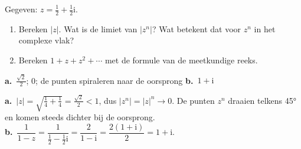 \begin{oefeningen}
\begin{oefening}[2]
 Gegeven: $z = \tfrac12 + \tfrac12\mathrm{i}$.
\begin{enumerate}
  \item Bereken $|z|$. Wat is de limiet van $|z^n|$? Wat betekent dat voor $z^n$ in het complexe vlak?
  \item Bereken $1 + z + z^2 + \cdots$ met de formule van de meetkundige reeks.
\end{enumerate}
\begin{solution}
\textbf{a.}~$\tfrac{\sqrt2}{2}$; 0; de punten spiraleren naar de oorsprong \quad \textbf{b.}~$1+\mathrm{i}$
\end{solution}
\begin{fullsolution}
\textbf{a.}~$|z|=\sqrt{\tfrac14+\tfrac14}=\tfrac{\sqrt2}{2}<1$, dus $|z^n|=|z|^n\to 0$. De punten $z^n$ draaien telkens 45° en komen steeds dichter bij de oorsprong.\\
\textbf{b.}~$\dfrac{1}{1-z}=\dfrac{1}{\tfrac12-\tfrac12\mathrm{i}}=\dfrac{2}{1-\mathrm{i}}=\dfrac{2(1+\mathrm{i})}{2}=1+\mathrm{i}$.
\end{fullsolution}
\end{oefening}


\end{oefeningen}
